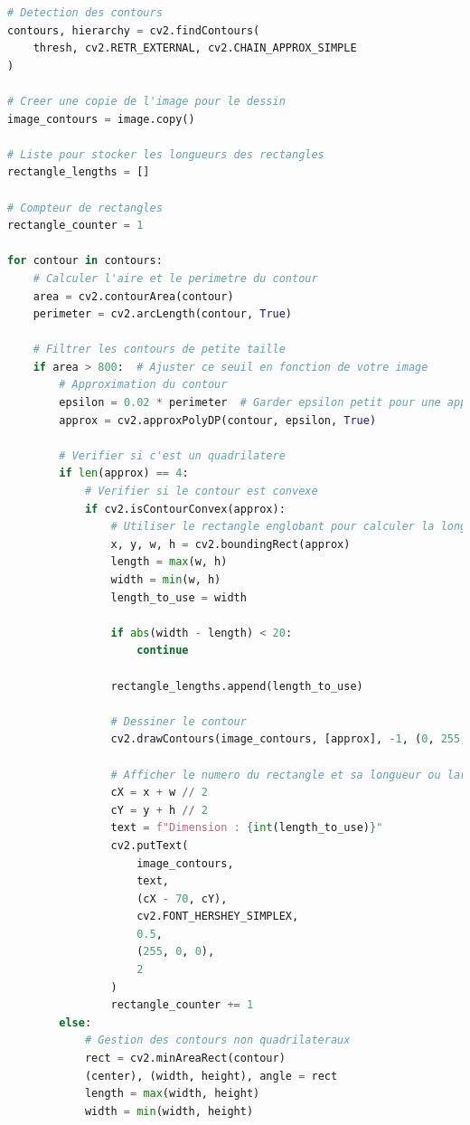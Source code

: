 \documentclass[11pt,letterpaper]{article}
\begin{document}
\begin{lstlisting}[language=python]
# Detection des contours
contours, hierarchy = cv2.findContours(
    thresh, cv2.RETR_EXTERNAL, cv2.CHAIN_APPROX_SIMPLE
)

# Creer une copie de l'image pour le dessin
image_contours = image.copy()

# Liste pour stocker les longueurs des rectangles
rectangle_lengths = []

# Compteur de rectangles
rectangle_counter = 1

for contour in contours:
    # Calculer l'aire et le perimetre du contour
    area = cv2.contourArea(contour)
    perimeter = cv2.arcLength(contour, True)

    # Filtrer les contours de petite taille
    if area > 800:  # Ajuster ce seuil en fonction de votre image
        # Approximation du contour
        epsilon = 0.02 * perimeter  # Garder epsilon petit pour une approximation precise
        approx = cv2.approxPolyDP(contour, epsilon, True)

        # Verifier si c'est un quadrilatere
        if len(approx) == 4:
            # Verifier si le contour est convexe
            if cv2.isContourConvex(approx):
                # Utiliser le rectangle englobant pour calculer la longueur et la largeur
                x, y, w, h = cv2.boundingRect(approx)
                length = max(w, h)
                width = min(w, h)
                length_to_use = width
                    
                if abs(width - length) < 20:
                    continue 

                rectangle_lengths.append(length_to_use)

                # Dessiner le contour
                cv2.drawContours(image_contours, [approx], -1, (0, 255, 0), 2)

                # Afficher le numero du rectangle et sa longueur ou largeur sur l'image
                cX = x + w // 2
                cY = y + h // 2
                text = f"Dimension : {int(length_to_use)}"
                cv2.putText(
                    image_contours,
                    text,
                    (cX - 70, cY),
                    cv2.FONT_HERSHEY_SIMPLEX,
                    0.5,
                    (255, 0, 0),
                    2
                )
                rectangle_counter += 1
        else:
            # Gestion des contours non quadrilateraux
            rect = cv2.minAreaRect(contour)
            (center), (width, height), angle = rect
            length = max(width, height)
            width = min(width, height)


\end{lstlisting}
\end{document}
